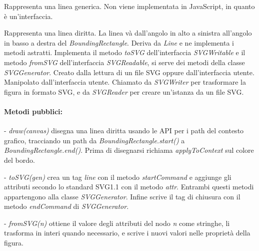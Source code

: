 Rappresenta una linea generica. Non viene implementata in JavaScript, in quanto \`e un'interfaccia.

Rappresenta una linea diritta. La linea v\`a dall'angolo in alto a sinistra all'angolo in basso a destra del \textit{BoundingRectangle}.
Deriva da \textit{Line} e ne implementa i metodi astratti. Implementa il metodo \textit{toSVG} dell'interfaccia \textit{SVGWritable} e il metodo \textit{fromSVG} dell'interfaccia \textit{SVGReadable}, si serve dei metodi della classe \textit{SVGGenerator}.
Creato dalla lettura di un file SVG oppure dall'interfaccia utente. Manipolato dall'interfaccia utente. Chiamato da \textit{SVGWriter} per trasformare la figura in formato SVG, e da \textit{SVGReader} per creare un'istanza da un file SVG.
\paragraph{Metodi pubblici:}
\begin{elencopuntato}[\subsubsecindent]
\item[-] \textit{draw(canvas)} disegna una linea diritta usando le API per i path del contesto grafico, tracciando un path da \textit{BoundingRectangle.start()} a \textit{BoundingRectangle.end()}. Prima di disegnarsi richiama \textit{applyToContext} sul colore del bordo.
\item[-] \textit{toSVG(gen)} crea un tag \textit{line} con il metodo \textit{startCommand} e aggiunge gli attributi secondo lo standard SVG1.1 con il metodo \textit{attr}. Entrambi questi metodi appartengono alla classe \textit{SVGGenerator}. Infine scrive il tag di chiusura con il metodo \textit{endCommand} di \textit{SVGGenerator}.
\item[-] \textit{fromSVG(n)} ottiene il valore degli attributi del nodo \textit{n} come stringhe, li trasforma in interi quando necessario, e scrive i nuovi valori nelle propriet\`a della figura. 
\end{elencopuntato}

